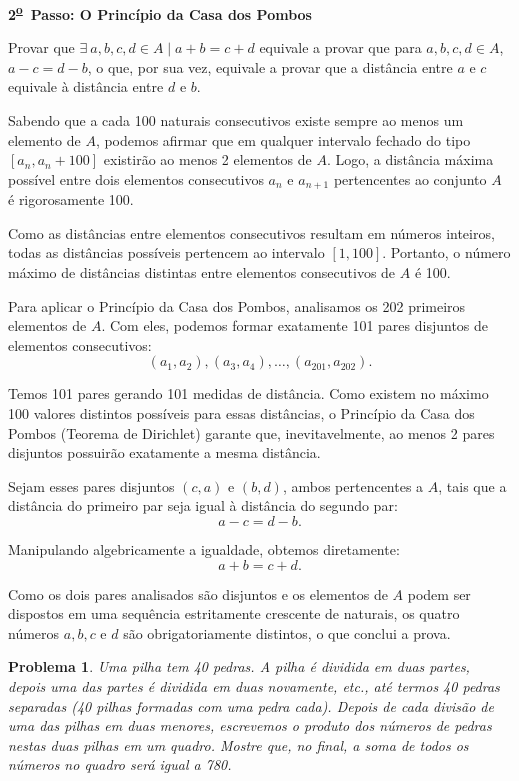 \documentclass{hipatia}
\newcommand{\superou}{\textsuperscript{\underline{o}}~}
\newtheorem{problem*}{Problema}
\begin{document}
\vspace{0.5cm}
\textbf{2\superou  Passo: O Princípio da Casa dos Pombos}

Provar que $\exists \ a, b, c, d \in A \mid a+b = c+d$ equivale a provar que para $a, b, c, d \in A$, $a-c = d-b$, o que, por sua vez, equivale a provar que a distância entre $a$ e $c$ equivale à distância entre $d$ e $b$.

Sabendo que a cada 100 naturais consecutivos existe sempre ao menos um elemento de $A$, podemos afirmar que em qualquer intervalo fechado do tipo $[a_n, a_n+100]$ existirão ao menos 2 elementos de $A$. Logo, a distância máxima possível entre dois elementos consecutivos $a_n$ e $a_{n+1}$ pertencentes ao conjunto $A$ é rigorosamente 100.

Como as distâncias entre elementos consecutivos resultam em números inteiros, todas as distâncias possíveis pertencem ao intervalo $[1, 100]$. Portanto, o número máximo de distâncias distintas entre elementos consecutivos de $A$ é 100.

Para aplicar o Princípio da Casa dos Pombos, analisamos os 202 primeiros elementos de $A$. Com eles, podemos formar exatamente 101 pares disjuntos de elementos consecutivos:
$$(a_1, a_2), (a_3, a_4), \dots, (a_{201}, a_{202}).$$

Temos 101 pares gerando 101 medidas de distância. Como existem no máximo 100 valores distintos possíveis para essas distâncias, o Princípio da Casa dos Pombos (Teorema de Dirichlet) garante que, inevitavelmente, ao menos 2 pares disjuntos possuirão exatamente a mesma distância.

Sejam esses pares disjuntos $(c, a)$ e $(b, d)$, ambos pertencentes a $A$, tais que a distância do primeiro par seja igual à distância do segundo par:
$$a - c = d - b.$$

Manipulando algebricamente a igualdade, obtemos diretamente:
$$a + b = c + d.$$

Como os dois pares analisados são disjuntos e os elementos de $A$ podem ser dispostos em uma sequência estritamente crescente de naturais, os quatro números $a, b, c$ e $d$ são obrigatoriamente distintos, o que conclui a prova.
















\begin{problem*} Uma pilha tem 40 pedras. A pilha é dividida em duas partes, depois uma das partes é dividida em duas novamente, etc., até termos 40 pedras separadas (40 pilhas formadas com uma pedra cada). Depois de cada divisão de uma das pilhas em duas menores, escrevemos o produto dos números de pedras nestas duas pilhas em um quadro. Mostre que, no final, a soma de todos os números no quadro será igual a 780. 

\end{problem*}
\end{document}
